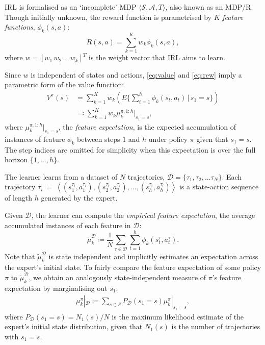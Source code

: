 \documentclass{aamas2016}
\begin{document}
IRL is formalised as an `incomplete' MDP $\langle\mathcal{S},\mathcal{A},T\rangle$, also known as an MDP/R. Though initially unknown, the reward function is parametrised by $K$ \emph{feature functions}, $\phi_k(s,a)$:
\begin{equation}
R(s,a) = \sum_{k=1}^Kw_k\phi_k(s,a), \label{eq:rew}
\end{equation}
where $w=[w_1\,w_2\,\ldots\,w_k]^T$ is the weight vector that IRL aims to learn.

Since $w$ is independent of states and actions, \eqref{eq:value} and \eqref{eq:rew} imply a parametric form of the value function:
\begin{align}
 	V^{\pi}(s) &= \sum^K_{k=1}w_k\left(E\{\sum_{t = 1}^h\phi_k(s_t,a_t)\,\vert\, s_1 = s\}\right)\\
&\eqqcolon\sum^K_{k=1}w_k\mu^{\pi, 1:h}_k|_{s_1=s},\label{eq:parametrized_value}
\end{align}
where $\mu^{\pi,1:h}_k|_{s_1=s}$, the \emph{feature expectation}, is the expected accumulation of instances of feature $\phi_k$ between steps $1$ and $h$ under policy $\pi$  given that $s_1 = s$. The step indices are omitted for simplicity when this expectation is over the full horizon $\{1,\ldots,h\}$.

The learner learns from a dataset of $N$ trajectories, $\mathcal{D} = \big\{ \tau_1,\tau_2,...\tau_N \big\}$. Each trajectory $\tau_i~=~\left<(s^{\tau_i}_1,a^{\tau_i}_1),(s^{\tau_i}_2,a^{\tau_i}_2),\ldots,(s^{\tau_i}_{h},a^{\tau_i}_{h})\right>$ is a state-action sequence of length $h$ generated by the expert.

Given $\mathcal{D}$, the learner can compute the \emph{empirical feature expectation}, the average accumulated instances of each feature in $\mathcal{D}$:
\begin{equation}
	\widetilde{\mu}^{\mathcal{D}}_k \coloneqq\frac{1}{N}\sum_{\tau\in\mathcal{D}}\sum_{t=1}^{h}\phi_k(s^\tau_t,a^\tau_t). \label{eqn:empirical_fe}
\end{equation}
Note that $\widetilde{\mu}^{\mathcal{D}}_k$ is state independent and implicitly estimates an expectation across
the expert's initial state.  To fairly compare the feature expectation of some policy $\pi$ to $\widetilde{\mu}^{\mathcal{D}}_k$, we obtain an analogously state-independent measure of $\pi$'s feature expectation by marginalising out $s_1$:
\begin{align}
  \label{eq:feature_expectation_belief}
  \mu^{\pi}_k|_{\mathcal{D}} \coloneqq \sum_{s\in\mathcal{S}}P_{\mathcal{D}}(s_1 = s)\mu^{\pi}_k|_{s_1=s},
\end{align}
where $P_{\mathcal{D}}(s_1 = s)= N_1(s)/N$ is the maximum likelihood estimate of the expert's initial state distribution, given that $N_1(s)$ is the number of trajectories with $s_1 = s$.
\end{document}

